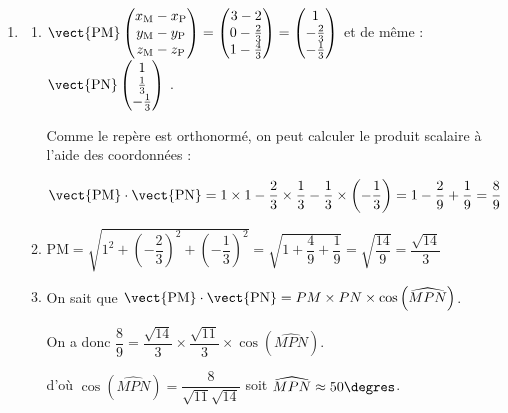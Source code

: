 \begin{enumerate}
	P est donc $M_{\frac{2}{3}}$ sur la droite (HM), il a donc comme coordonnées :

$x_P=2$, $y_P=2-2\times \dfrac{2}{3}=\dfrac{6}{3}-\dfrac{4}{3}=\dfrac{2}{3}$ et $z_P=2-\dfrac{2}{3}=\dfrac{6}{3}-\dfrac{2}{3}=\dfrac{4}{3}$ .

Cela confirme P$\left(2~;~\dfrac{2}{3} ~;~\dfrac{4}{3}\right) $

\item 
	\begin{enumerate}
		\item $\vect{\mathrm{PM}}\begin{pmatrix} x_\mathrm{M}-x_\mathrm{P}\\y_\mathrm{M}-y_\mathrm{P}\\z_\mathrm{M}-z_\mathrm{P} \end{pmatrix} = \begin{pmatrix} 3-2\\0-\frac{2}{3}\\1-\frac{4}{3}\end{pmatrix}= \begin{pmatrix} 1\\-\frac{2}{3}\\-\frac{1}{3}\end{pmatrix}$ \quad et de même : $\vect{\mathrm{PN}} \begin{pmatrix} 1\\\frac{1}{3}\\-\frac{1}{3}\end{pmatrix}$ .

Comme le repère est orthonormé, on peut calculer le produit scalaire à l'aide des coordonnées :

$ \vect{\mathrm{PM}}\cdot \vect{\mathrm{PN}} = 1\times 1  -\dfrac{2}{3} \times \dfrac{1}{3} -\dfrac{1}{3} \times \left(-\dfrac{1}{3}\right) = 1 -\dfrac{2}{9}+\dfrac{1}{9} = \dfrac{8}{9}$

		\item $\mathrm{PM}=\sqrt{1^2+{\left(-\dfrac{2}{3}   \right)}^2 +{\left(-\dfrac{1}{3}   \right)}^2} =\sqrt{1+\dfrac{4}{9}+\dfrac{1}{9}}=\sqrt{\dfrac{14}{9}}=\dfrac{\sqrt{14}}{3}$

		\item On sait que $\vect{\mathrm{PM}}\cdot \vect{\mathrm{PN}}=PM \times PN \times \cos\left( \widehat{MPN}\right)$.

On a donc $\dfrac{8}{9}=\dfrac{\sqrt{14}}{3}\times \dfrac{\sqrt{11}}{3}\times \cos \left( \widehat{MPN} \right)$.

d'où $\cos \left( \widehat{MPN} \right) = \dfrac{8}{\sqrt{11}\sqrt{14}}$ soit $\widehat{MPN}\approx 50\degres$.


\end{enumerate}
\end{enumerate}
